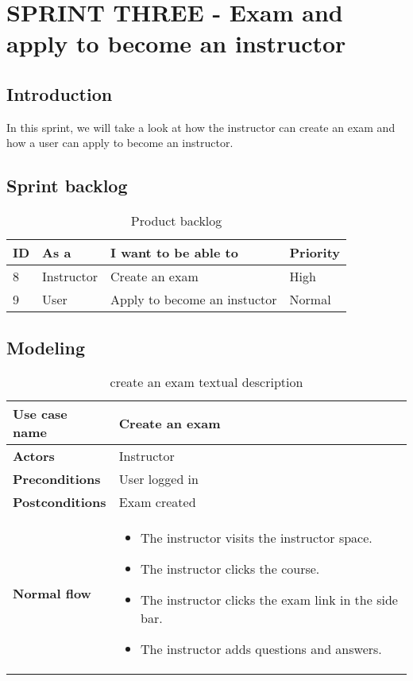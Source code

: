 \chapter{SPRINT THREE - Exam and apply to become an instructor}
\newpage
\section*{Introduction}
In this sprint, we will take a look at how the instructor can create an exam and how a user can apply to become an instructor.
\section{Sprint backlog}
\begin{table}[H]
\centering
\caption{Product backlog}
\begin{tabular}{|p{1cm}|p{3cm}|p{6cm}|p{2cm}|}
\hline
\rowcolor{brown!18}\textbf{\large{ID}} & \textbf{\large{As a}} & \textbf{\large{I want to be able to}} & \textbf{\large{Priority}} \\
\hline
8& Instructor & Create an exam & High\\\hline
9& User & Apply to become an instuctor  & Normal \\\hline
\end{tabular}
\end{table}



\section{Modeling}

\begin{table}[H]
\centering
\caption{create an exam textual description}
\begin{tabular}{|p{4cm}|p{10cm}|}
\hline
\textbf{\large{Use case name}} & Create an exam \\\hline
\textbf{\large{Actors}} & Instructor \\\hline
\textbf{\large{Preconditions}} & User logged in \\\hline
\textbf{\large{Postconditions}} & Exam created  \\\hline
\textbf{\large{Normal flow}} & 
\begin{itemize}
  \item The instructor visits the instructor space.
  \item The instructor clicks the course.
  \item The instructor clicks the exam link in the side bar.
  \item The instructor adds questions and answers.
\end{itemize}
\\\hline

\end{tabular}
\end{table}

